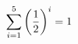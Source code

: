 \documentclass[preview]{standalone}
\begin{document}
\begin{align*}
\sum_{i=1}^{ 5 } \left({ 1 } \over {2} \right)^i = { 1 }
\end{align*}
\end{document}
